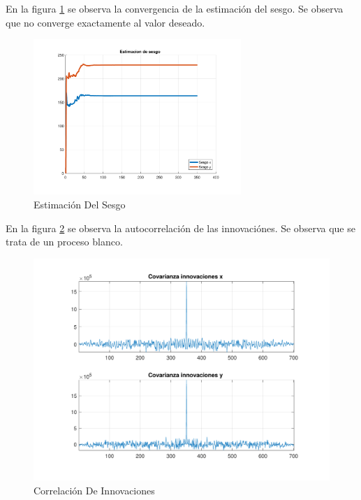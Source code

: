 	En la figura \ref{fig:ej4a_bias} se observa la convergencia de la estimación del sesgo. Se observa que no converge exactamente al valor deseado.
	
	\begin{figure}[H]
		\centering
		\includegraphics[width=0.7\textwidth,keepaspectratio]{Figuras/bias_ej4a.pdf}
		\caption{Estimación Del Sesgo}
		\label{fig:ej4a_bias}
	\end{figure}
	
	En la figura \ref{fig:ej4a_cov} se observa la autocorrelación de las innovaciónes. Se observa que se trata de un proceso blanco.
	
	\begin{figure}[H]
		\centering
		\includegraphics[width=1.0\textwidth,keepaspectratio]{Figuras/covinn_ej4a.pdf}
		\caption{Correlación De Innovaciones}
		\label{fig:ej4a_cov}
	\end{figure}
	

